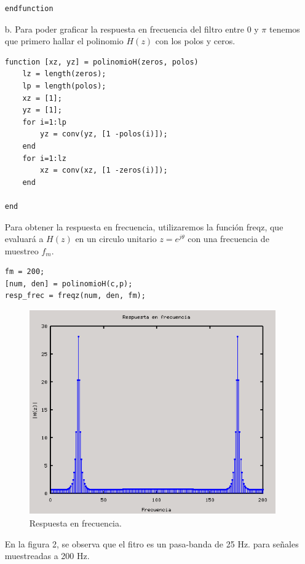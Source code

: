 \documentclass[10pt,a4paper,final]{article}
\begin{document}
\begin{itemize}
\begin{lstlisting}
endfunction
\end{lstlisting}

\item[b.] Para poder graficar la respuesta en frecuencia del filtro entre 0 y $\pi$ tenemos que primero hallar el polinomio $H(z)$ con los polos y ceros.

\begin{lstlisting}
function [xz, yz] = polinomioH(zeros, polos)
    lz = length(zeros);
    lp = length(polos);
    xz = [1];
    yz = [1];
    for i=1:lp
        yz = conv(yz, [1 -polos(i)]);
    end
    for i=1:lz
        xz = conv(xz, [1 -zeros(i)]);
    end
    
end
\end{lstlisting}
Para obtener la respuesta en frecuencia, utilizaremos la función freqz, que evaluará a $H(z)$ en un circulo unitario $z = e^{j\theta}$ con una frecuencia de muestreo $f_m$.

\begin{lstlisting}
fm = 200;
[num, den] = polinomioH(c,p);
resp_frec = freqz(num, den, fm);
\end{lstlisting}

\begin{figure}[h!]
\centering
  \caption{Respuesta en frecuencia.}
  \label{fig:resp}
  \includegraphics[scale=0.4]{fig2.png}
    
\end{figure}

En la figura 2, se observa que el fitro es un pasa-banda de 25 Hz. para señales muestreadas a 200 Hz.


\end{itemize}
\end{document}
